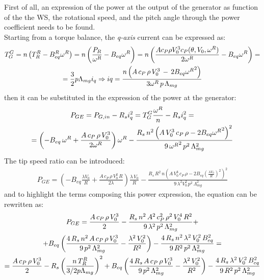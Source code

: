 First of all, an expression of the power at the output of the generator as function of the the WS, the rotational speed, and the pitch angle through the power coefficient needs to be found. \\
Starting from a torque balance, the \textit{q-axis} current can be expressed as:
\begin{gather}
  T_G^G = n\left(T_R^R - B_{eq}^R\omega^R\right) = n\left(\frac{P_R}{\omega^R} - B_{eq}\omega^R\right) = n\left(\frac{A c_P \rho V_0^3 c_P(\theta, V_0, \omega^R)}{2\omega^R} - B_{eq}\omega^R\right) = \notag \\
   = \frac{3}{2}p\Lambda_{mg}i_q \Rightarrow iq = \frac{n\left(A \, c_P \, \rho \, V_0^3 \,-\,2B_{eq}{\omega^R}^2\right)}{3\omega^R\,p\,\Lambda_{mg}} 
\end{gather}
then it can be substituted in the expression of the power at the generator:
\begin{gather}
  P_{GE} = P_{G, in} - R_s i_q^2 = T_G^G \frac{\omega^R}{n} - R_s i_q^2 = \\ \notag
  = \left(-B_{eq}\,\omega^R + \frac{A\,c_P\,\rho\,V_0^3}{2\omega^R}\right)\omega^R - \frac{R_s\, n^2\left(A\,V_0^3\,c_P\,\rho - 2B_{eq}{\omega^R}^{2}\right)^2}{9\,{\omega^R}^{2}\,p^2\,\Lambda_{mg}^2} \label{eq:P_G_out_eq}
\end{gather}
The tip speed ratio can be introduced:
\begin{gather}
  P_{GE} = \left(-B_{eq}\frac{\lambda V_0}{R} + \frac{A\,c_P\,\rho\,V_0^2\,R}{2\lambda}\right)\frac{\lambda \, V_0}{R} - \frac{R_s\,R^2\,n\left(A\,V_0^3\,c_P\,\rho - 2B_{eq}\left(\frac{\lambda V_0}{R}\right)^2\right)^2}{9\,\lambda^2V_0^2\,p^2\,\Lambda_{mg}^2}\label{eq:P_G_out_lambda}
\end{gather} 
and to highlight the terms composing this power expression, the equation can be rewritten as:
\begin{gather} 
   P_{GE} = \frac{A\,c_P\,\rho\,V_0^3}{2} - \frac{R_s\,n^2\,A^2\,c_P^2\,\rho^2\,V_0^4\,R^2}{9\,\lambda^2\,p^2\,\Lambda_{mg}^2} + \notag \\
   +B_{eq}\left(\frac{4\,R_s\,n^2\,A\,c_P\,\rho\,V_0^3}{9\,p^2\,\Lambda_{mg}^2} - \frac{\lambda^2\,V_0^2}{R^2}\right) - \frac{4\,R_s\,n^2\,\lambda^2\,V_0^2\,B_{eq}^2}{9\,R^2\,p^2\,\Lambda_{mg}^2} =  \notag \\
   = \frac{A\,c_P\,\rho\,V_0^3}{2} - R_s \left(\frac{n\,T_R^R}{3/2p\Lambda_{mg}}\right)^2 + B_{eq}\left(\frac{4\,R_s\,A\,c_P\,\rho\,V_0^3}{9\,p^2\,\Lambda_{mg}^2} - \frac{\lambda^2\,V_0^2}{R^2}\right) - \frac{4\,R_s\,\lambda^2\,V_0^2\,B_{eq}^2}{9\,R^2\,p^2\,\Lambda_{mg}^2} 
   \label{eq:P_G_out_damping}
\end{gather}

